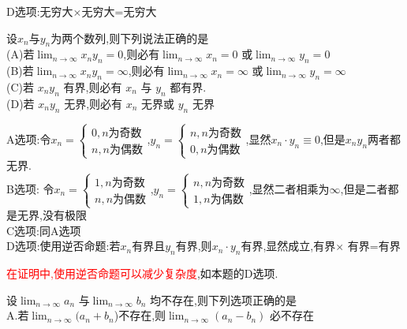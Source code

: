 \documentclass[8pt a4paper, oneside, UTF8]{ctexbook}
\begin{document}
\begin{sloppypar}
\begin{solution}
        D选项:无穷大$\times$无穷大=无穷大
    \end{solution}
    \begin{problem}
        设$x_n$与${y_n}$为两个数列,则下列说法正确的是\\
        (A)若$\lim_{n\to\infty} x_ny_n=0$,则必有$\lim_{n\to\infty} x_n=0$ 或$\lim_{n\to\infty} y_n=0$\\
        (B)若$\lim_{n\to\infty} x_ny_n=\infty$,则必有$\lim_{n\to\infty} x_n=\infty$ 或$\lim_{n\to\infty}y_n=\infty$\\
        (C)若 $x_ny_n$ 有界,则必有 $x_n$ 与 $y_n$ 都有界.\\
        (D)若 $x_ny_n$ 无界,则必有 $x_n$ 无界或 $y_n$ 无界
    \end{problem}
    \begin{solution}
        A选项:令$x_n=\begin{cases}
            0, n\text{为奇数}\\
            n,n\text{为偶数}
        \end{cases}$,$y_n=\begin{cases}
            n,n\text{为奇数}\\
            0, n\text{为偶数}
        \end{cases}$,显然$x_n \cdot y_n \equiv 0$,但是$x_n y_n$两者都无界.\\
        B选项: 令$x_n=\begin{cases}
            1,n\text{为奇数}\\
            n,n\text{为偶数}
        \end{cases}$,$y_n=\begin{cases}
            n,n\text{为奇数}\\            
            1,n\text{为偶数}
        \end{cases}$,显然二者相乘为$\infty$,但是二者都是无界,没有极限\\
        C选项:同A选项\\
        D选项:使用逆否命题:若$x_n$有界且$y_n$有界,则$x_n \cdot y_n$有界,显然成立,有界$\times$ 有界=有界
    \end{solution}
    \begin{note}
       \textcolor{red}{在证明中,使用逆否命题可以减少复杂度},如本题的D选项.
    \end{note}
    \begin{problem}
        设$\lim_{n\to\infty} a_n$ 与$\lim_{n\to\infty} b_n$ 均不存在,则下列选项正确的是\\
        A.若$\lim_{n \to \infty}(a_n+b_n$)不存在,则$\lim_{n \to \infty}(a_n-b_n)$ 必不存在 \\ 

\end{problem}
\end{sloppypar}
\end{document}
